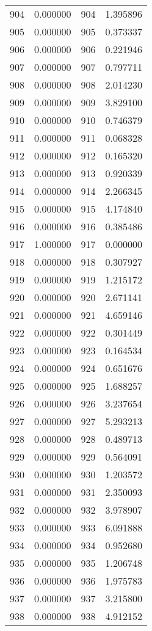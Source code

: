 \documentclass[12pt]{article}
\begin{document}
\begin{longtable}{@{}cccc@{}}
904 & 0.000000 & 904 & 1.395896 \\
905 & 0.000000 & 905 & 0.373337 \\
906 & 0.000000 & 906 & 0.221946 \\
907 & 0.000000 & 907 & 0.797711 \\
908 & 0.000000 & 908 & 2.014230 \\
909 & 0.000000 & 909 & 3.829100 \\
910 & 0.000000 & 910 & 0.746379 \\
911 & 0.000000 & 911 & 0.068328 \\
912 & 0.000000 & 912 & 0.165320 \\
913 & 0.000000 & 913 & 0.920339 \\
914 & 0.000000 & 914 & 2.266345 \\
915 & 0.000000 & 915 & 4.174840 \\
916 & 0.000000 & 916 & 0.385486 \\
917 & 1.000000 & 917 & 0.000000 \\
918 & 0.000000 & 918 & 0.307927 \\
919 & 0.000000 & 919 & 1.215172 \\
920 & 0.000000 & 920 & 2.671141 \\
921 & 0.000000 & 921 & 4.659146 \\
922 & 0.000000 & 922 & 0.301449 \\
923 & 0.000000 & 923 & 0.164534 \\
924 & 0.000000 & 924 & 0.651676 \\
925 & 0.000000 & 925 & 1.688257 \\
926 & 0.000000 & 926 & 3.237654 \\
927 & 0.000000 & 927 & 5.293213 \\
928 & 0.000000 & 928 & 0.489713 \\
929 & 0.000000 & 929 & 0.564091 \\
930 & 0.000000 & 930 & 1.203572 \\
931 & 0.000000 & 931 & 2.350093 \\
932 & 0.000000 & 932 & 3.978907 \\
933 & 0.000000 & 933 & 6.091888 \\
934 & 0.000000 & 934 & 0.952680 \\
935 & 0.000000 & 935 & 1.206748 \\
936 & 0.000000 & 936 & 1.975783 \\
937 & 0.000000 & 937 & 3.215800 \\
938 & 0.000000 & 938 & 4.912152 \\

\end{longtable}
\end{document}

